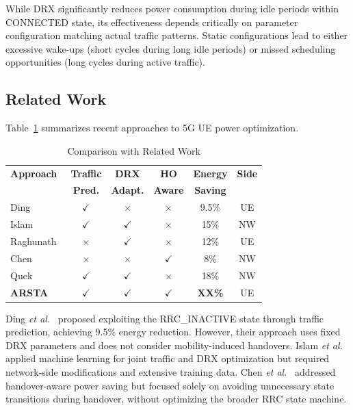 \documentclass[conference]{IEEEtran}
\newcommand{\etal}{\textit{et al.}}
\begin{document}
While DRX significantly reduces power consumption during idle periods within CONNECTED state, its effectiveness depends critically on parameter configuration matching actual traffic patterns. Static configurations lead to either excessive wake-ups (short cycles during long idle periods) or missed scheduling opportunities (long cycles during active traffic).

\subsection{Related Work}
\label{subsec:related}

Table~\ref{tab:related_work} summarizes recent approaches to 5G UE power optimization.

\begin{table}[t]
\centering
\caption{Comparison with Related Work}
\label{tab:related_work}
\begin{tabular}{@{}lccccc@{}}
\toprule
\textbf{Approach} & \textbf{Traffic} & \textbf{DRX} & \textbf{HO} & \textbf{Energy} & \textbf{Side} \\
 & \textbf{Pred.} & \textbf{Adapt.} & \textbf{Aware} & \textbf{Saving} & \\
\midrule
Ding~\cite{Ding2024} & $\checkmark$ & $\times$ & $\times$ & 9.5\% & UE \\
Islam~\cite{IslamJSAC2023} & $\checkmark$ & $\checkmark$ & $\times$ & 15\% & NW \\
Raghunath~\cite{Raghunath2022} & $\times$ & $\checkmark$ & $\times$ & 12\% & UE \\
Chen~\cite{WCNC2023HO} & $\times$ & $\times$ & $\checkmark$ & 8\% & NW \\
Quek~\cite{Quek2021} & $\checkmark$ & $\checkmark$ & $\times$ & 18\% & NW \\
\midrule
\textbf{ARSTA} & $\checkmark$ & $\checkmark$ & $\checkmark$ & \textbf{XX\%} & UE \\
\bottomrule
\end{tabular}
\end{table}

Ding \etal~\cite{Ding2024} proposed exploiting the RRC\_INACTIVE state through traffic prediction, achieving 9.5\% energy reduction. However, their approach uses fixed DRX parameters and does not consider mobility-induced handovers. Islam \etal~\cite{IslamJSAC2023} applied machine learning for joint traffic and DRX optimization but required network-side modifications and extensive training data. Chen \etal~\cite{WCNC2023HO} addressed handover-aware power saving but focused solely on avoiding unnecessary state transitions during handover, without optimizing the broader RRC state machine.
\end{document}
